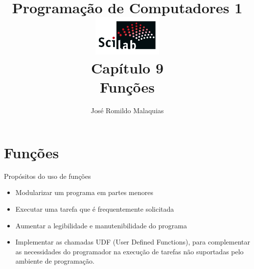 


\usepackage{alltt}
\usepackage{tikz}
\usetikzlibrary{calc}
\usetikzlibrary{shapes.callouts}
\usetikzlibrary{decorations.text}%

\newcommand{\refnode}[2]{%
  \tikz[remember picture,baseline=-.5ex]{%
    \node[draw](#1){#2};
  }%
}

\newcommand{\pos}[1]{%
  \tikz[remember picture,overlay,baseline=-.5ex]{%
    \node(#1){\phantom{X}};
  }%
}

\PYstyledefault



\title[PC1-09 Funções]{
  {\large Programação de Computadores 1}\\[2mm]
  \includegraphics[height=2cm]{images/scilab.png}\\
  {\normalsize Capítulo 9}\\
  Funções
}
\subject{Programação de Computadores}
\author{José Romildo Malaquias}
\date{\semester}

\frame{\titlepage}

\frame{\tableofcontents}

\section{Funções}

\begin{frame}[fragile]{Propósitos do uso de funções}
  \begin{itemize}
    \item Modularizar um programa em partes menores
    \item Executar uma tarefa que é frequentemente solicitada
    \item Aumentar a legibilidade e manutenibilidade do programa
    \item Implementar as chamadas UDF (User Defined Functions), para
    complementar as necessidades do programador na execução de tarefas
    não suportadas pelo ambiente de programação.
  \end{itemize}
\end{frame}

